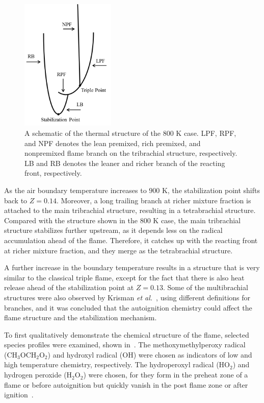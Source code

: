 \documentclass[review,3p,times]{elsarticle}
\begin{document}
\begin{figure}[t]
  \centering
  \scriptsize
  \includegraphics[width=0.4\textwidth]{schematic_800.png}
  \normalsize
  \caption{A schematic of the thermal structure of the $800$ K case.  LPF, RPF, and NPF denotes the lean premixed, rich premixed, and nonpremixed flame branch on the tribrachial structure, respectively.  LB and RB denotes the leaner and richer branch of the reacting front, respectively.}
  \label{fig:schematic_800}
\end{figure}

As the air boundary temperature increases to $900$ K, the stabilization point shifts back to $Z = 0.14$.  Moreover, a long trailing branch at richer mixture fraction is attached to the main tribrachial structure, resulting in a tetrabrachial structure.  Compared with the structure shown in the $800$ K case, the main tribrachial structure stabilizes further upstream, as it depends less on the radical accumulation ahead of the flame.  Therefore, it catches up with the reacting front at richer mixture fraction, and they merge as the tetrabrachial structure.

A further increase in the boundary temperature results in a structure that is very similar to the classical triple flame, except for the fact that there is also heat release ahead of the stabilization point at $Z = 0.13$.  Some of the multibrachial structures were also observed by Krisman \emph{et al.}~\cite{krisman14}, using different definitions for branches, and it was concluded that the autoignition chemistry could affect the flame structure and the stabilization mechanism.  

To first qualitatively demonstrate the chemical structure of the flame, selected species profiles were examined, shown in~.  The methoxymethylperoxy radical (CH$_3$OCH$_2$O$_2$) and hydroxyl radical (OH) were chosen as indicators of low and high temperature chemistry, respectively.  The hydroperoxyl radical (HO$_2$) and hydrogen peroxide (H$_2$O$_2$) were chosen, for they form in the preheat zone of a flame or before autoignition but quickly vanish in the post flame zone or after ignition~\cite{yoo09}.
\end{document}
